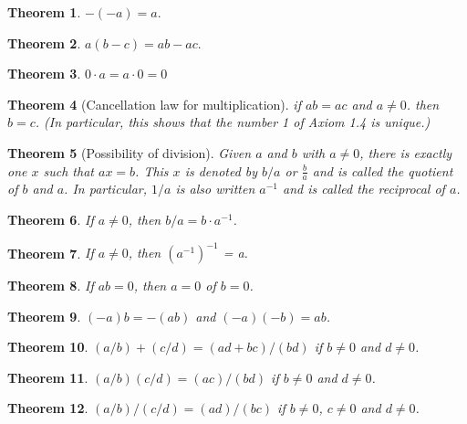 \documentclass{article}
\newtheorem{theorem}{Theorem}[section]
\begin{document}
\begin{theorem}
\(-(-a) = a.\)
\end{theorem}

\begin{theorem}
\(a(b - c) = ab - ac.\)
\end{theorem}

\begin{theorem}
\(0 \cdot a = a \cdot 0 = 0\)
\end{theorem}

\begin{theorem}[Cancellation law for multiplication]
if \(ab = ac\) and \(a \neq 0\). then \(b = c\). (In particular, this shows that the number 1 of Axiom 1.4 is unique.)
\end{theorem}

\begin{theorem}[Possibility of division]
Given  \(a\) and \(b\) with \(a \neq 0\), there is exactly one \(x\) such that \(ax = b\). This \(x\) is denoted by \(b/a\) or \(\frac{b}{a}\) and is called the quotient of \(b\) and \(a\). In particular, \(1/a\) is also written \(a^{-1}\) and is called the reciprocal of \(a\).
\end{theorem}

\begin{theorem}
If \(a \neq 0\), then \(b/a = b \cdot a^{-1}\).
\end{theorem}

\begin{theorem}
If \(a \neq 0\), then \((a^{-1})^{-1}\) = a.
\end{theorem}

\begin{theorem}
If \(ab = 0\), then \(a = 0\) of \(b = 0\).
\end{theorem}

\begin{theorem}
\((-a)b = -(ab)\) and \((-a)(-b) = ab\).
\end{theorem}

\begin{theorem}
\((a/b) + (c/d) = (ad + bc)/(bd)\) if \(b \neq 0\) and \(d \neq 0\).
\end{theorem}

\begin{theorem}
\((a/b)(c/d) = (ac)/(bd)\) if \(b \neq 0\) and \(d \neq 0\).
\end{theorem}

\begin{theorem}
\((a/b)/(c/d) = (ad)/(bc)\) if \(b \neq 0\), \(c \neq 0\) and \(d \neq 0\).
\end{theorem}
\end{document}
